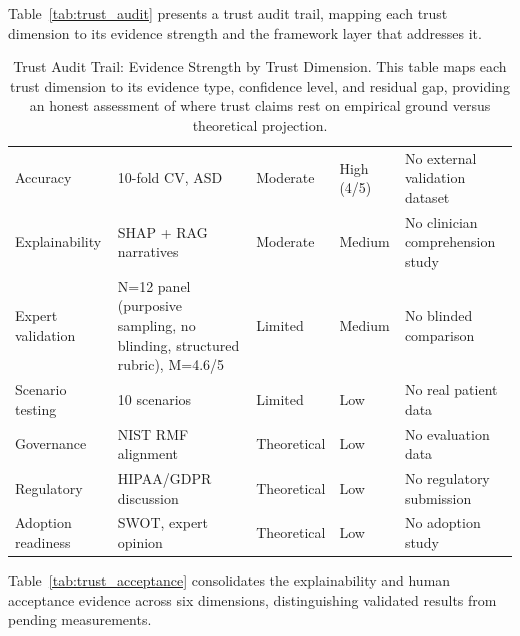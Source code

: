 \noindent Table~\ref{tab:trust_audit} presents a trust audit trail, mapping each trust dimension to its evidence strength and the framework layer that addresses it.



\begin{table}[H]
\tablestripes\tablefontsize
\tablefontsize
\centering
\caption[Trust Audit Trail: Evidence Strength by Trust Dimension]{Trust Audit Trail: Evidence Strength by Trust Dimension. This table maps each trust dimension to its evidence type, confidence level, and residual gap, providing an honest assessment of where trust claims rest on empirical ground versus theoretical projection.}
\begin{tabularx}{\textwidth}{@{} >{\raggedright\arraybackslash}p{1.8cm} L >{\raggedright\arraybackslash}p{1.4cm} >{\raggedright\arraybackslash}p{1.2cm} L @{}}
\toprule
{} &  &  &  &  \\
\midrule
Accuracy & 10-fold CV, ASD & Moderate & High (4/5) & No external validation dataset \\
Explainability & SHAP + RAG narratives & Moderate & Medium & No clinician comprehension study \\
Expert validation & N=12 panel (purposive sampling, no blinding, structured rubric), M=4.6/5 & Limited & Medium & No blinded comparison \\
Scenario testing & 10 scenarios & Limited & Low & No real patient data \\
Governance & NIST RMF alignment & Theoretical & Low & No evaluation data \\
Regulatory & HIPAA/GDPR discussion & Theoretical & Low & No regulatory submission \\
Adoption readiness & SWOT, expert opinion & Theoretical & Low & No adoption study \\
\bottomrule
\end{tabularx}
\end{table}

Table~\ref{tab:trust_acceptance} consolidates the explainability and human acceptance evidence across six dimensions, distinguishing validated results from pending measurements.

